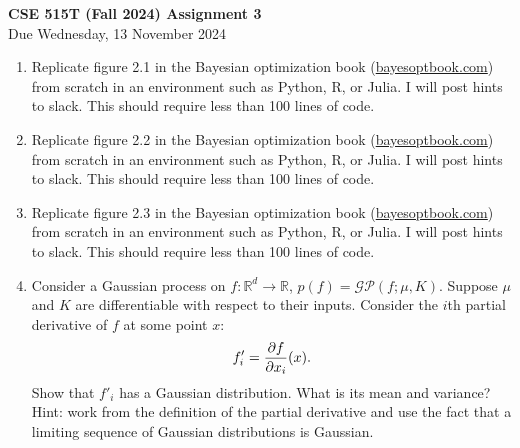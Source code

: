 \documentclass{article}
\newcommand{\mc}[1]{\mathcal{#1}}
\newcommand{\R}{\mathbb{R}}
\begin{document}
{\large \textbf{CSE 515T (Fall 2024) Assignment 3}} \\
Due Wednesday, 13 November 2024 \\

\begin{enumerate}

\item

  Replicate figure 2.1 in the Bayesian optimization book
  (\url{bayesoptbook.com}) from scratch in an environment such as Python, R, or
  Julia.  I will post hints to slack.  This should require less than 100 lines
  of code.

\item

  Replicate figure 2.2 in the Bayesian optimization book
  (\url{bayesoptbook.com}) from scratch in an environment such as Python, R, or
  Julia.  I will post hints to slack.  This should require less than 100 lines
  of code.

\item

  Replicate figure 2.3 in the Bayesian optimization book
  (\url{bayesoptbook.com}) from scratch in an environment such as Python, R, or
  Julia.  I will post hints to slack.  This should require less than 100 lines
  of code.

\item

  Consider a Gaussian process on $f\colon \R^d \to \R$, $p(f) = \mc{GP}(f; \mu,
  K).$ Suppose $\mu$ and $K$ are differentiable with respect to their
  inputs. Consider the $i$th partial derivative of $f$ at some point $x$:
  \[
  f'_i = \begin{frac}{\partial f}{\partial x_i}(x)\end{frac}.
  \]
  Show that $f'_i$ has a Gaussian distribution. What is its mean and variance?
  Hint: work from the definition of the partial derivative and use the fact that
  a limiting sequence of Gaussian distributions is Gaussian.

\end{enumerate}
\end{document}
